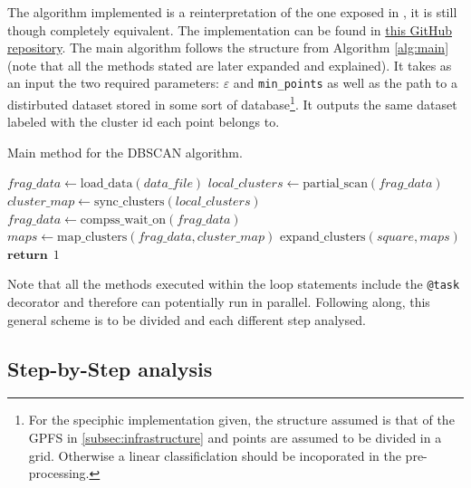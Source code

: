 \documentclass[10pt,journal,compsoc]{IEEEtran}
\let\MYoriglatexcaption\caption
\renewcommand{\caption}[2][\relax]{\MYoriglatexcaption[#2]{#2}}
\begin{document}
The algorithm implemented is a reinterpretation of the one exposed in \cite{ReferencePaper}, it is still though completely equivalent. The implementation can be found in \href{https://github.com/csegarragonz/DBSCAN-pyCOMPSs}{this GitHub repository}. The main algorithm follows the structure from  Algorithm \ref{alg:main} (note that all the methods stated are later expanded and explained). It takes as an input the two required parameters: $\varepsilon$ and \texttt{min\_points} as well as the path to a distirbuted dataset stored in some sort of database\footnote{For the speciphic implementation given, the structure assumed is that of the GPFS in \ref{subsec:infrastructure} and points are assumed to be divided in a grid. Otherwise a linear classificlation should be incoporated in the pre-processing.}. It outputs the same dataset labeled with the cluster id each point belongs to.

\begin{algorithm}
  \caption{Main method for the DBSCAN algorithm. \label{alg:main}}
  \begin{algorithmic}[1]
            \State $frag\_data \gets \text{load\_data}(data\_file)$
            \State $local\_clusters \gets \text{partial\_scan}(frag\_data)$
            \State $cluster\_map \gets \text{sync\_clusters}(local\_clusters)$
        \EndFor
        \State $frag\_data \gets \text{compss\_wait\_on}(frag\_data)$
        \State $ maps \gets \text{map\_clusters} (frag\_data, cluster\_map)$
            \State $\text{expand\_clusters} (square, maps)$
        \EndFor
        \State $\textbf{return} \hspace{5pt} 1$
    \EndFunction
  \end{algorithmic}
\end{algorithm}

Note that all the methods executed within the loop statements include the \texttt{@task} decorator and therefore can potentially run in parallel. Following along, this general scheme is to be divided and each different step analysed.

\subsection{Step-by-Step analysis} \label{step_by_step}
\end{document}
